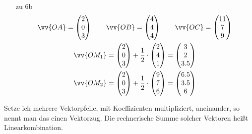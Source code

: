 \begin{itemize}
\begin{gather*}
  \end{gather*}
  \item [zu 6b]
  \begin{gather*}
    \vv{OA} = \begin{pmatrix}2 \\ 0 \\ 3\end{pmatrix} \qquad \vv{OB} = \begin{pmatrix}4 \\ 4 \\ 4\end{pmatrix} \qquad \vv{OC} = \begin{pmatrix}11 \\ 7 \\ 9\end{pmatrix} \\
    \vv{OM_1} = \begin{pmatrix}2 \\ 0 \\ 3\end{pmatrix} + \frac{1}{2} \cdot \begin{pmatrix}2 \\ 4 \\ 1\end{pmatrix} = \begin{pmatrix}3 \\ 2 \\ 3.5\end{pmatrix} \\
    \vv{OM_2} = \begin{pmatrix}2 \\ 0 \\ 3\end{pmatrix} + \frac{1}{2} \cdot \begin{pmatrix}9 \\ 7 \\ 6\end{pmatrix} = \begin{pmatrix}6.5 \\ 3.5 \\ 6\end{pmatrix}
  \end{gather*}
\end{itemize}
Setze ich mehrere Vektorpfeile, mit Koeffizienten multipliziert, aneinander, so nennt man das einen Vektorzug. Die rechnerische Summe solcher Vektoren heißt Linearkombination.
\newpage
